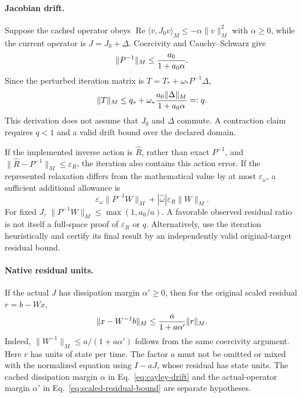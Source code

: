 \paragraph{Jacobian drift.}
Suppose the cached operator obeys
$\operatorname{Re}\langle v,J_0v\rangle_M\leq-\alpha\|v\|_M^2$ with
$\alpha\geq0$, while the current operator is $J=J_0+\Delta$.
Coercivity and Cauchy--Schwarz give
\begin{equation}
 \|P^{-1}\|_M\leq{a_0\over1+a_0\alpha}.
\end{equation}
Since the perturbed iteration matrix is
$T=T_*+\omega_*P^{-1}\Delta$,
\begin{equation}
 \|T\|_M\leq q_*+
 \omega_*{a_0\|\Delta\|_M\over1+a_0\alpha}=:q.
 \label{eq:cayley-drift}
\end{equation}
This derivation does not assume that $J_0$ and $\Delta$ commute.  A contraction
claim requires $q<1$ and a valid drift bound over the declared domain.

If the implemented inverse action is $\widehat R$, rather than exact
$P^{-1}$, and
$\|\widehat R-P^{-1}\|_M\leq\varepsilon_R$, the iteration also contains this
action error.  If the represented relaxation differs from the mathematical
value by at most $\varepsilon_\omega$, a sufficient additional allowance is
\begin{equation}
 \varepsilon_\omega\|P^{-1}W\|_M+
 |\widehat\omega|\varepsilon_R\|W\|_M.
 \label{eq:inverse-action-allowance}
\end{equation}
For fixed $J$, $\|P^{-1}W\|_M\leq\max(1,a_0/a)$.
A favorable observed residual ratio is not itself a full-space proof of
$\varepsilon_R$ or $q$.  Alternatively, use the iteration heuristically and
certify its final result by an independently valid original-target residual
bound.

\paragraph{Native residual units.}
If the actual $J$ has dissipation margin $\alpha'\geq0$, then for the original
scaled residual $r=b-Wx$,
\begin{equation}
 \|x-W^{-1}b\|_M
 \leq{a\over1+a\alpha'}\|r\|_M.
 \label{eq:scaled-residual-bound}
\end{equation}
Indeed, $\|W^{-1}\|_M\leq a/(1+a\alpha')$ follows from the same coercivity
argument.  Here $r$ has units of state per time.  The factor $a$ must not be
omitted or mixed with the normalized equation using $I-aJ$, whose residual
has state units.  The cached dissipation margin $\alpha$ in
Eq.~\eqref{eq:cayley-drift} and the actual-operator margin $\alpha'$ in
Eq.~\eqref{eq:scaled-residual-bound} are separate hypotheses.

